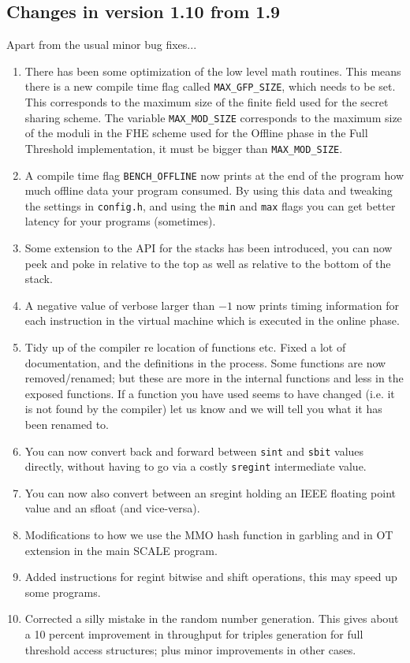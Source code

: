 \subsection{Changes in version 1.10 from 1.9}
Apart from the usual minor bug fixes...
\begin{enumerate}
\item There has been some optimization of the low level math routines. This means
	there is a new compile time flag called \verb+MAX_GFP_SIZE+, which needs
	to be set. This corresponds to the maximum size of the finite field used
	for the secret sharing scheme. The variable  \verb+MAX_MOD_SIZE+ corresponds
	to the maximum size of the moduli in the FHE scheme used for the Offline
	phase in the Full Threshold implementation, it must be bigger than \verb+MAX_MOD_SIZE+.
\item  A compile time flag \verb+BENCH_OFFLINE+ now prints at the end of the program
	how much offline data your program consumed. By using this data and tweaking
	the settings in \verb|config.h|, and using the \verb|min| and \verb|max| flags
	you can get better latency for your programs (sometimes).
\item   Some extension to the API for the stacks has been introduced, you can
	now peek and poke in relative to the top as well as relative to the bottom
	of the stack.
\item A negative value of verbose larger than $-1$ now prints timing information
	for each instruction in the virtual machine which is executed in the online
	phase.
\item Tidy up of the compiler re location of functions etc. 
	Fixed a lot of documentation, and the definitions in the process. 
	Some functions are now removed/renamed; but these are
	more in the internal functions and less in the exposed functions.
	If a function you have used seems to have changed (i.e. it is not found
	by the compiler) let us know and we will tell you what it has been
        renamed to.
\item You can now convert back and forward between \verb|sint| and \verb|sbit| values
	directly, without having to go via a costly \verb|sregint| intermediate
	value.
\item You can now also convert between an sregint holding an IEEE floating
	point value and an sfloat (and vice-versa).
\item Modifications to how we use the MMO hash function in garbling and in OT
	extension in the main SCALE program.
\item Added instructions for regint bitwise and shift operations, this may speed up some
        programs.
\item Corrected a silly mistake in the random number generation. This gives
	about a 10 percent improvement in throughput for triples generation
	for full threshold access structures; plus minor improvements in
	other cases.
\end{enumerate}

